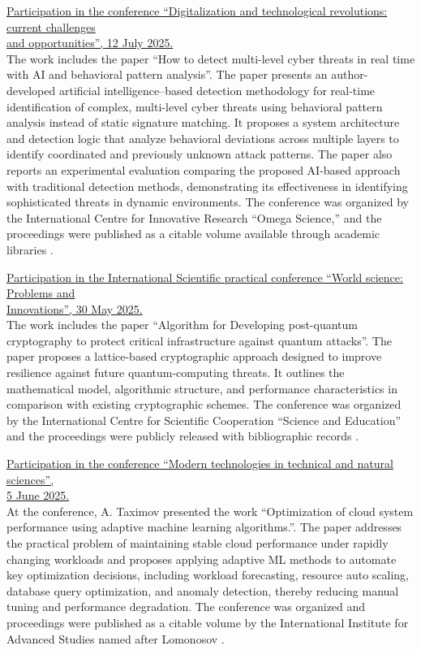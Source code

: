 \noindent\underline{Participation in the conference ``Digitalization and technological revolutions: current challenges} \\
\noindent\underline{and opportunities'', 12 July 2025.} \\
The work includes the paper ``How to detect multi-level cyber threats in real time with AI and behavioral pattern analysis''. The paper presents an author-developed artificial intelligence–based detection methodology for real-time identification of complex, multi-level cyber threats using behavioral pattern analysis instead of static signature matching. It proposes a system architecture and detection logic that analyze behavioral deviations across multiple layers to identify coordinated and previously unknown attack patterns. The paper also reports an experimental evaluation comparing the proposed AI-based approach with traditional detection methods, demonstrating its effectiveness in identifying sophisticated threats in dynamic environments. The conference was organized by the International Centre for Innovative Research ``Omega Science,'' and the proceedings were published as a citable volume available through academic libraries .

\bigskip

\noindent\underline{Participation in the International Scientific practical conference ``World science: Problems and} \\
\noindent\underline{Innovations'', 30 May 2025.} \\
The work includes the paper ``Algorithm for Developing post-quantum cryptography to protect critical infrastructure against quantum attacks''. The paper proposes a lattice-based cryptographic approach designed to improve resilience against future quantum-computing threats. It outlines the mathematical model, algorithmic structure, and performance characteristics in comparison with existing cryptographic schemes. The conference was organized by the International Centre for Scientific Cooperation ``Science and Education'' and the proceedings were publicly released with bibliographic records .

\bigskip

\noindent\underline{Participation in the conference ``Modern technologies in technical and natural sciences'',} \\
\noindent\underline{5 June 2025.} \\
At the conference, A. Taximov presented the work ``Optimization of cloud system performance using adaptive machine learning algorithms.''. The paper addresses the practical problem of maintaining stable cloud performance under rapidly changing workloads and proposes applying adaptive ML methods to automate key optimization decisions, including workload forecasting, resource auto scaling, database query optimization, and anomaly detection, thereby reducing manual tuning and performance degradation. The conference was organized and proceedings were published as a citable volume by the International Institute for Advanced Studies named after Lomonosov .

